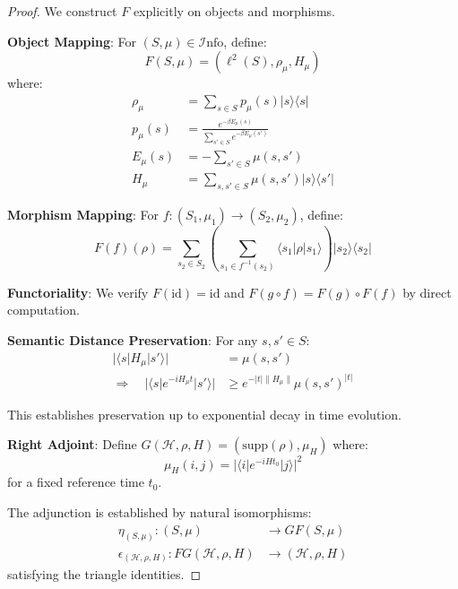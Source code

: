\documentclass[11pt]{article}
\theoremstyle{definition}
\newcommand{\Info}{\mathcal{I}\text{nfo}}
\newcommand{\Hil}{\mathcal{H}}
\newcommand{\supp}{\text{supp}}
\newcommand{\id}{\text{id}}
\begin{document}
\begin{proof}
We construct $F$ explicitly on objects and morphisms.

\textbf{Object Mapping}: For $(S, \mu) \in \Info$, define:
\begin{equation}
F(S, \mu) = \left(\ell^2(S), \rho_\mu, H_\mu\right)
\end{equation}
where:
\begin{align}
\rho_\mu &= \sum_{s \in S} p_\mu(s) |s\rangle\langle s| \\
p_\mu(s) &= \frac{e^{-\beta E_\mu(s)}}{\sum_{s' \in S} e^{-\beta E_\mu(s')}} \\
E_\mu(s) &= -\sum_{s' \in S} \mu(s, s') \\
H_\mu &= \sum_{s, s' \in S} \mu(s, s') |s\rangle\langle s'|
\end{align}

\textbf{Morphism Mapping}: For $f: (S_1, \mu_1) \to (S_2, \mu_2)$, define:
\begin{equation}
F(f)(\rho) = \sum_{s_2 \in S_2} \left(\sum_{s_1 \in f^{-1}(s_2)} \langle s_1|\rho|s_1\rangle\right) |s_2\rangle\langle s_2|
\end{equation}

\textbf{Functoriality}: We verify $F(\id) = \id$ and $F(g \circ f) = F(g) \circ F(f)$ by direct computation.

\textbf{Semantic Distance Preservation}: For any $s, s' \in S$:
\begin{align}
|\langle s|H_\mu|s'\rangle| &= \mu(s, s') \\
\Rightarrow \quad |\langle s|e^{-iH_\mu t}|s'\rangle| &\geq e^{-|t|\|H_\mu\|} \mu(s, s')^{|t|}
\end{align}

This establishes preservation up to exponential decay in time evolution.

\textbf{Right Adjoint}: Define $G(\Hil, \rho, H) = (\supp(\rho), \mu_H)$ where:
\begin{equation}
\mu_H(i, j) = |\langle i|e^{-iHt_0}|j\rangle|^2
\end{equation}
for a fixed reference time $t_0$.

The adjunction is established by natural isomorphisms:
\begin{align}
\eta_{(S,\mu)}: (S, \mu) &\to GF(S, \mu) \\
\epsilon_{(\Hil,\rho,H)}: FG(\Hil, \rho, H) &\to (\Hil, \rho, H)
\end{align}
satisfying the triangle identities.
\end{proof}
\end{document}
